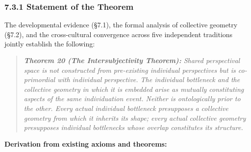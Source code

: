 \subsubsection*{7.3.1 Statement of the Theorem}


The developmental evidence (§7.1), the formal analysis of collective geometry (§7.2), and the cross-cultural convergence across five independent traditions jointly establish the following:


\begin{quote}
\itshape
\textbf{Theorem 20 (The Intersubjectivity Theorem):} \textit{Shared perspectival space is not constructed from pre-existing individual perspectives but is co-primordial with individual perspective. The individual bottleneck and the collective geometry in which it is embedded arise as mutually constituting aspects of the same individuation event. Neither is ontologically prior to the other. Every actual individual bottleneck presupposes a collective geometry from which it inherits its shape; every actual collective geometry presupposes individual bottlenecks whose overlap constitutes its structure.}
\end{quote}


\textbf{Derivation from existing axioms and theorems:}



